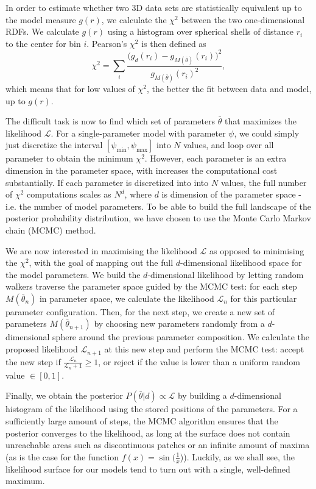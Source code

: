 \documentclass[aps,pre,twocolumn,letterpaper,floatfix,showpacs]{revtex4}
\begin{document}
In order to estimate whether two 3D data sets are statistically equivalent up to
the model measure $g(r)$, we calculate the $\chi^2$ between the two one-dimensional
RDFs. We calculate $g(r)$ using a histogram over spherical shells of distance $r_i$ to the center for bin $i$. Pearson's $\chi^2$ is then defined as 
\begin{equation}
  \chi^2 = \sum_{i} \frac{ \Big(g_d(r_i) - g_{M(\bar \theta)}(r_i) \Big)^2}{g_{M(\bar \theta)}(r_i)^2},
\end{equation}
which means that for low values of $\chi^2$, the better the fit between data and model, up to $g(r)$.

The difficult task is now to find which set of parameters $\bar\theta$ that maximizes the likelihood $\mathcal L$.
For a single-parameter model with parameter $\psi$, we could simply just discretize the interval $[\psi_\text{min}, \psi_\text{max}]$ into $N$ values,
and loop over all parameter to obtain the minimum $\chi^2$.
However, each parameter is an extra dimension in the parameter space, with increases the computational cost substantially.
If each parameter is discretized into into $N$ values, the full number of $\chi^2$ computations
scales as $N^d$, where $d$ is dimension of the parameter space - i.e. the number of model parameters. To be able to build
the full landscape of the posterior probability distribution, we have chosen to use the Monte Carlo Markov chain (MCMC) method.

We are now interested in maximising the likelihood $\mathcal L$ as opposed to
minimising the $\chi^2$, with the goal of mapping out the full $d$-dimensional
likelihood space for the model parameters. We build the $d$-dimensional likelihood
by letting random walkers traverse the parameter space guided by the MCMC test:
for each step $M(\bar \theta_{n})$ in parameter space, we calculate the likelihood
$\mathcal L_n$ for this particular parameter configuration. Then, for the next
step, we create a new set of parameters $M(\bar \theta_{n+1})$ by choosing new
parameters randomly from a $d$-dimensional sphere around the previous parameter
composition. We calculate the proposed
likelihood $\mathcal L_{n+1}$ at this new step and perform the MCMC test: accept
the new step if $\frac{\mathcal L_n}{\mathcal L_n+1} \ge 1$, or reject if the value
is lower than a uniform random value $\in [0,1]$. 

Finally, we obtain the posterior $P(\bar \theta | d) \propto \mathcal L$ by building
a $d$-dimensional histogram of the likelihood using the stored positions of the parameters.
For a sufficiently large amount of steps, the MCMC algorithm ensures that the posterior
converges to the likelihood, as long at the surface does not contain unreachable areas
such as discontinuous patches or an infinite amount of maxima (as is the case for the
function $f(x)=\sin(\frac{1}{x}$)). Luckily, as we shall see, the likelihood surface for
our models tend to turn out with a single, well-defined maximum.  
\end{document}
